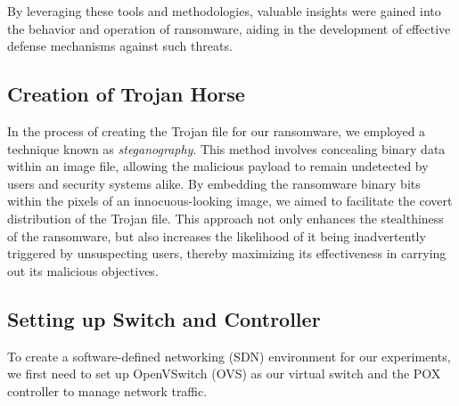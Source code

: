 \documentclass[12pt,letterpaper]{article}
\begin{document}
        By leveraging these tools and methodologies, valuable insights were gained into the behavior and operation of ransomware, aiding in the development of effective defense mechanisms against such threats.

        \subsection{Creation of Trojan Horse}

        In the process of creating the Trojan file for our ransomware, we employed a technique known as \textit{steganography}. This method involves concealing binary data within an image file, allowing the malicious payload to remain undetected by users and security systems alike. By embedding the ransomware binary bits within the pixels of an innocuous-looking image, we aimed to facilitate the covert distribution of the Trojan file. This approach not only enhances the stealthiness of the ransomware, but also increases the likelihood of it being inadvertently triggered by unsuspecting users, thereby maximizing its effectiveness in carrying out its malicious objectives.

        \subsection{Setting up Switch and Controller}

        To create a software-defined networking (SDN) environment for our experiments, we first need to set up OpenVSwitch (OVS) as our virtual switch and the POX controller to manage network traffic.
\end{document}
